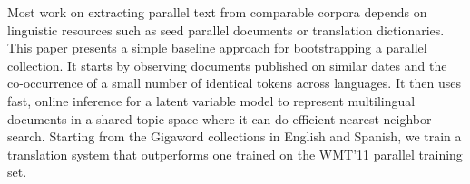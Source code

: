 Most work on extracting parallel text from comparable corpora depends on linguistic resources such as seed parallel documents or translation dictionaries. This paper presents a simple baseline approach for bootstrapping a parallel collection. It starts by observing documents published on similar dates and the co-occurrence of a small number of identical tokens across languages. It then uses fast, online inference for a latent variable model to represent multilingual documents in a shared topic space where it can do efficient nearest-neighbor search. Starting from the Gigaword collections in English and Spanish, we train a translation system that outperforms one trained on the WMT'11 parallel training set.
